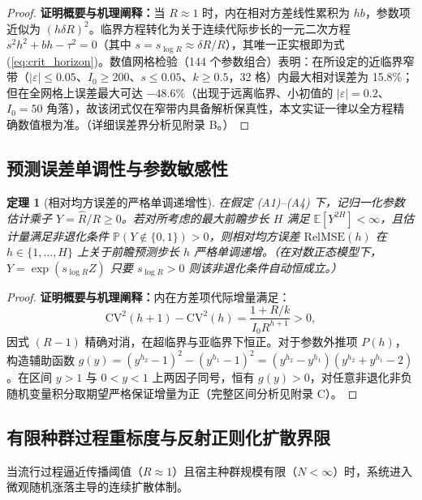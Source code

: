 \documentclass[11pt,a4paper]{article}
\theoremstyle{plain}
\newtheorem{theorem}{定理}
\theoremstyle{definition}
\begin{document}
\begin{proof}
\textbf{证明概要与机理阐释：}当 $R \approx 1$ 时，内在相对方差线性累积为 $h b$，参数项近似为 $(h\delta R)^2$。临界方程转化为关于连续代际步长的一元二次方程 $s^2 h^2 + b h - \tau^2 = 0$（其中 $s = s_{\log R} \approx \delta R / R$），其唯一正实根即为式 (\ref{eq:crit_horizon})。数值网格检验（144 个参数组合）表明：在所设定的近临界窄带（$|\varepsilon| \le 0.05$、$I_0 \ge 200$、$s \le 0.05$、$k \ge 0.5$，32 格）内最大相对误差为 15.8\%；但在全网格上误差最大可达 $-48.6\%$（出现于远离临界、小初值的 $|\varepsilon|=0.2$、$I_0=50$ 角落），故该闭式仅在窄带内具备解析保真性，本文实证一律以全方程精确数值根为准。（详细误差界分析见附录 B。）
\end{proof}

\subsection{预测误差单调性与参数敏感性}

\begin{theorem}[相对均方误差的严格单调递增性]\label{thm:monotonicity}
在假定 (A1)--(A4) 下，记归一化参数估计乘子 $Y = \hat{R}/R \ge 0$。若对所考虑的最大前瞻步长 $H$ 满足 $\mathbb{E}[Y^{2H}] < \infty$，且估计量满足非退化条件 $\mathbb{P}(Y \notin \{0, 1\}) > 0$，则相对均方误差 $\text{RelMSE}(h)$ 在 $h \in \{1, \dots, H\}$ 上关于前瞻预测步长 $h$ 严格单调递增。（在对数正态模型下，$Y = \exp(s_{\log R} Z)$ 只要 $s_{\log R} > 0$ 则该非退化条件自动恒成立。）
\end{theorem}

\begin{proof}
\textbf{证明概要与机理阐释：}内在方差项代际增量满足：
\begin{equation*}
\text{CV}^2(h+1) - \text{CV}^2(h) = \frac{1+R/k}{I_0 R^{h+1}} > 0,
\end{equation*}
因式 $(R-1)$ 精确对消，在超临界与亚临界下恒正。对于参数外推项 $P(h)$，构造辅助函数 $g(y) = (y^{h_2}-1)^2 - (y^{h_1}-1)^2 = (y^{h_2}-y^{h_1})(y^{h_2}+y^{h_1}-2)$。在区间 $y>1$ 与 $0<y<1$ 上两因子同号，恒有 $g(y) > 0$，对任意非退化非负随机变量积分取期望严格保证增量为正（完整区间分析见附录 C）。
\end{proof}

\subsection{有限种群过程重标度与反射正则化扩散界限}

当流行过程逼近传播阈值（$R \approx 1$）且宿主种群规模有限（$N < \infty$）时，系统进入微观随机涨落主导的连续扩散体制。
\end{document}
